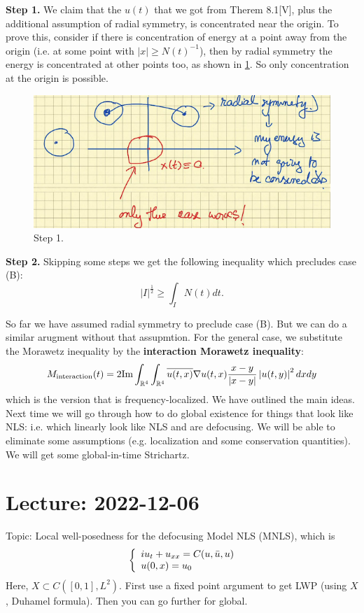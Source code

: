 \documentclass{article}
\def\R{\mathbb{R}} %
\begin{document}
\textbf{Step 1.} We claim that the $u(t)$ that we got from Therem 8.1[V], plus
the additional assumption of radial symmetry, is concentrated near the origin.
To prove this, consider if there is concentration of energy at a point away from
the origin (i.e. at some point with $|x| \geq N(t)^{-1}$), then by radial
symmetry the energy is concentrated at other points too, as shown in
\cref{fig:radial-symmetry}. So only concentration at the origin is possible.

\begin{figure}[h]
  \centering
  \includegraphics[scale=.5]{radial-symmetry}
  \caption{Step 1.}
  \label{fig:radial-symmetry}
\end{figure}


\textbf{Step 2.} Skipping some steps we get the following inequality which
precludes case (B):
\begin{equation*}
  |I|^{\frac{1}{2}} \geq  \int_{I} N(t)dt.
\end{equation*}


So far we have assumed radial symmetry to preclude case (B). But we can do a similar arugment without
that assupmtion. For the general case, we substitute the Morawetz inequality by
the \textbf{interaction Morawetz inequality}:
\begin{equation*}
  M_{\rm interaction}(t) 
  = 2 \mathrm{Im} \int_{\R^4 }\int_{\R^4 }  \overline{u(t,x)}\nabla u(t,x) \frac{x-y}{|x-y|} \left| u(t,y) \right|^{2}dxdy
\end{equation*}
which is the version that is frequency-localized. We have outlined the main
ideas. Next time we will go through how to do global existence for things that
look like NLS: i.e. which linearly look like NLS and are defocusing. We will be
able to eliminate some assumptions (e.g. localization and some conservation
quantities). We will get some global-in-time Strichartz.

\section{Lecture: 2022-12-06}
Topic: Local well-posedness for the defocusing Model NLS (MNLS), which is
\begin{equation*}
  \left\{ \begin{array}{l@{}l}
      iu_{t}+u_{xx}=C(u,\bar{u},u) \\
      u(0,x)=u_{0}
    \end{array}\right.
\end{equation*}
Here, $X \subset C([0,1],L^{2})$.  First use a fixed point argument to get LWP
(using $X$, Duhamel formula). Then you can go further for global.
\end{document}
